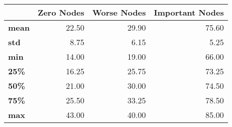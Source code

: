 \begin{tabular}{lrrr}
\toprule
{} &  Zero Nodes &  Worse Nodes &  Important Nodes \\
\midrule
\textbf{mean} &       22.50 &        29.90 &            75.60 \\
\textbf{std } &        8.75 &         6.15 &             5.25 \\
\textbf{min } &       14.00 &        19.00 &            66.00 \\
\textbf{25\% } &       16.25 &        25.75 &            73.25 \\
\textbf{50\% } &       21.00 &        30.00 &            74.50 \\
\textbf{75\% } &       25.50 &        33.25 &            78.50 \\
\textbf{max } &       43.00 &        40.00 &            85.00 \\
\bottomrule
\end{tabular}
